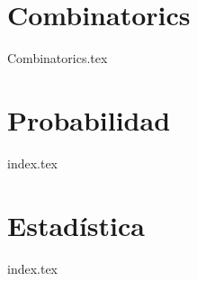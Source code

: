 \chapter{Combinatorics}
{Combinatorics.tex}
\chapter{Probabilidad}
{index.tex}
\chapter{Estad\'istica}
{index.tex}
